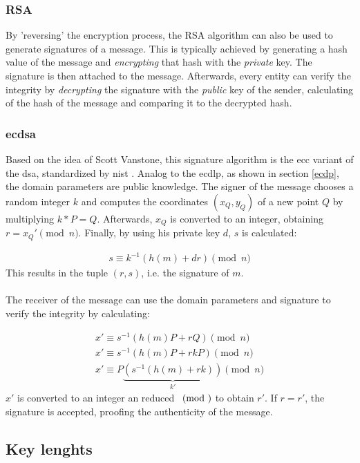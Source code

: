\subsubsection{RSA}

By 'reversing' the encryption process, the RSA algorithm can also be used to generate signatures of a message.
This is typically achieved by generating a hash value of the message and \textit{encrypting} that hash with the \textit{private} key. The signature is then attached to the
message. Afterwards, every entity can verify the integrity by \textit{decrypting} the signature with the \textit{public} key of the sender, calculating of
the hash of the message and comparing it to the decrypted hash.

\subsubsection{\gls{ecdsa}}

Based on the idea of Scott Vanstone, this signature algorithm is the \gls{ecc} variant of the \gls{dsa}, standardized by \gls{nist} \cite{nistECDSA}.
Analog to the \gls{ecdlp}, as shown in section \ref{ecdp}, the domain parameters are public knowledge. The signer of the message chooses a random integer $k$ and
computes the coordinates $(x_Q, y_Q)$ of a new point $Q$ by multiplying $k*P = Q$. Afterwards, $x_Q$ is converted to an integer, obtaining $r = x_Q' \pmod n$. Finally,
by using his private key $d$, $s$ is calculated:

\begin{align}\label{ecdsLabel}
s \equiv k^{-1}(h(m)+dr) \pmod n
\end{align}
This results in the tuple $(r,s)$, i.e. the signature of $m$.
\\
\\
The receiver of the message can use the domain parameters and signature to verify the integrity by calculating:

\begin{align*}
 x' \equiv s^{-1}(h(m)P + rQ) \pmod n\\
 x' \equiv s^{-1}(h(m)P + rkP) \pmod n\\
 x' \equiv P \underbrace{(s^{-1}(h(m) + rk))}_{k'} \pmod n
\end{align*}
$x'$ is converted to an integer an reduced $\pmod$ to obtain $r'$. If $r = r'$, the signature is accepted, proofing the authenticity of the message.


\subsection{Key lenghts}

